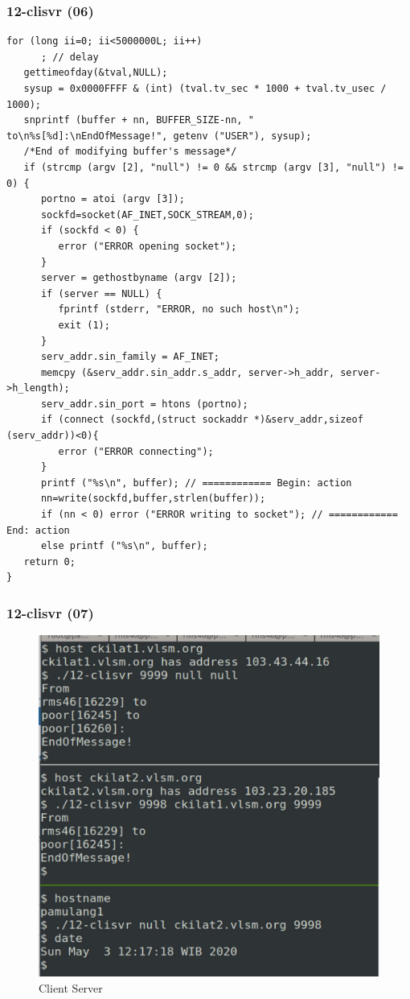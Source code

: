 \documentclass[xcolor=table, notheorems, hyperref={pdfpagelabels=false}]{beamer}
\begin{document}
\begin{frame}[fragile]
\frametitle{12-clisvr (06)}
\begin{lstlisting}[basicstyle=\ttfamily\tiny]
   for (long ii=0; ii<5000000L; ii++)
      ; // delay
   gettimeofday(&tval,NULL);
   sysup = 0x0000FFFF & (int) (tval.tv_sec * 1000 + tval.tv_usec / 1000);
   snprintf (buffer + nn, BUFFER_SIZE-nn, " to\n%s[%d]:\nEndOfMessage!", getenv ("USER"), sysup);
   /*End of modifying buffer's message*/
   if (strcmp (argv [2], "null") != 0 && strcmp (argv [3], "null") != 0) {
      portno = atoi (argv [3]);
      sockfd=socket(AF_INET,SOCK_STREAM,0);
      if (sockfd < 0) {
         error ("ERROR opening socket");
      }
      server = gethostbyname (argv [2]);
      if (server == NULL) {
         fprintf (stderr, "ERROR, no such host\n");
         exit (1);
      }
      serv_addr.sin_family = AF_INET;
      memcpy (&serv_addr.sin_addr.s_addr, server->h_addr, server->h_length);
      serv_addr.sin_port = htons (portno);
      if (connect (sockfd,(struct sockaddr *)&serv_addr,sizeof (serv_addr))<0){
         error ("ERROR connecting");
      }
      printf ("%s\n", buffer); // ============ Begin: action
      nn=write(sockfd,buffer,strlen(buffer));
      if (nn < 0) error ("ERROR writing to socket"); // ============ End: action
      else printf ("%s\n", buffer);
   return 0;
}

\end{lstlisting}
\end{frame}

\begin{frame}[fragile]
\frametitle{12-clisvr (07)}

\begin{figure}
\includegraphics[width=0.6\linewidth]{os-clisvr}
\caption{Client Server}
\end{figure}

\end{frame}
\end{document}
